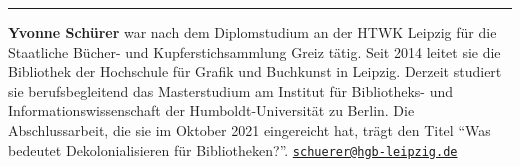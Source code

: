 \begin{center}\rule{0.5\linewidth}{0.5pt}\end{center}

\textbf{Yvonne Schürer} war nach dem Diplomstudium an der HTWK Leipzig
für die Staatliche Bücher- und Kupferstichsammlung Greiz tätig. Seit
2014 leitet sie die Bibliothek der Hochschule für Grafik und Buchkunst
in Leipzig. Derzeit studiert sie berufsbegleitend das Masterstudium am
Institut für Bibliotheks- und Informationswissenschaft der
Humboldt-Universität zu Berlin. Die Abschlussarbeit, die sie im Oktober
2021 eingereicht hat, trägt den Titel \enquote{Was bedeutet Dekolonialisieren
für Bibliotheken?}. \href{mailto:schuerer@hgb-leipzig.de}{\nolinkurl{schuerer@hgb-leipzig.de}}
